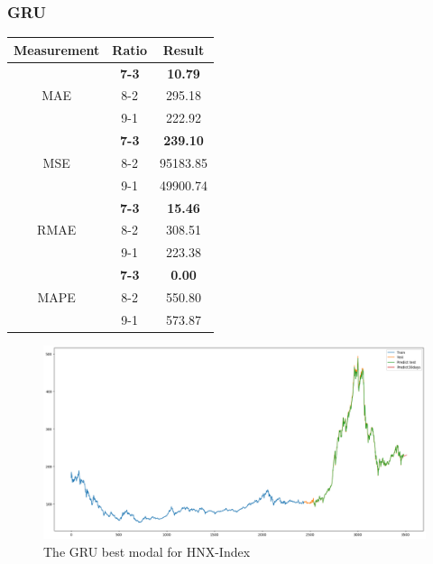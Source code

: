 \documentclass{ieeeojies}
\begin{document}
\subsubsection{GRU}
\begin{table}[H]
    \centering
    \begin{tabular}{|c|c|c|}
        \hline
         Measurement & Ratio &  Result  \\
        \hline
             & \textbf{7-3} & \textbf{10.79}  \\
        MAE  & 8-2 & 295.18  \\
            & {9-1} & {222.92}  \\
        \hline
           & \textbf{7-3} & \textbf{239.10}  \\
        MSE  & 8-2 & 95183.85  \\
            & {9-1} & {49900.74}  \\
        \hline
           & \textbf{7-3} & \textbf{15.46}  \\
        RMAE  & 8-2 & 308.51  \\
            & {9-1} & {223.38}  \\
        \hline
           & \textbf{7-3} &\textbf{ 0.00}  \\
        MAPE  & 8-2 & 550.80  \\
            & {9-1} & {573.87}  \\
        \hline
    \end{tabular}
    \label{table:example}
\end{table}
\begin{figure}[H]
    \centering
    \includegraphics[width=0.8\linewidth]{GRU-HNX-73.png}
    \caption{The GRU best modal for HNX-Index}
    \label{fig:example}
\end{figure}
\end{document}
